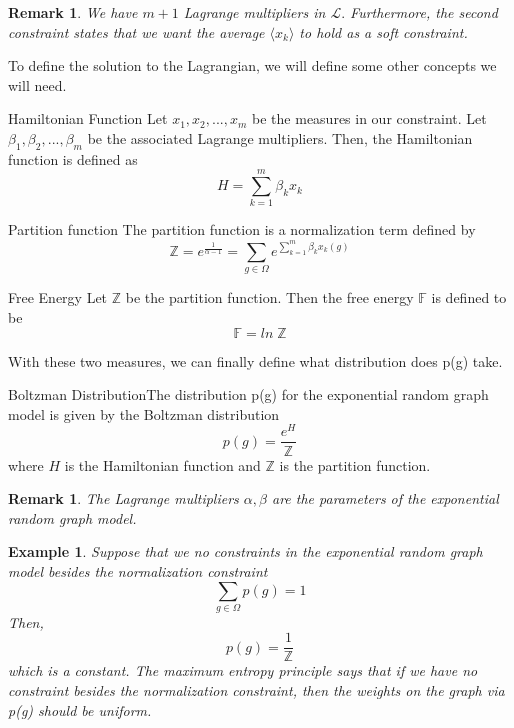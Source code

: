 \documentclass[twoside]{article}
\newtheorem{remark}[theorem]{Remark}
\newtheorem{example}[theorem]{Example}
\begin{document}
\begin{remark} We have $m + 1$ Lagrange multipliers in $\mathcal{L}.$ Furthermore, the second constraint states that we want the average $\langle x_k \rangle$ to hold as a soft constraint.
\end{remark}

To define the solution to the Lagrangian, we will define some other concepts we will need.

\begin{definition_exam}{Hamiltonian Function}{} Let $x_1, x_2, ..., x_m$ be the measures in our constraint. Let $\beta_1, \beta_2, ..., \beta_m$ be the associated Lagrange multipliers. Then, the Hamiltonian function is defined as 
$$
H = \sum_{k=1}^{m}\beta_kx_k
$$
\end{definition_exam}

\begin{definition_exam}{Partition function}{} The partition function is a normalization term defined by 
$$
\mathbb{Z} = e^{\frac{1}{\alpha - 1}} = \sum_{g \in \Omega}e^{\sum_{k=1}^{m}\beta_k x_k(g)}
$$
\end{definition_exam}

\begin{definition_exam}{Free Energy}{} Let $\mathbb{Z}$ be the partition function. Then the free energy $\mathbb{F}$ is defined to be 
$$
\mathbb{F} = ln\;\mathbb{Z}
$$
\end{definition_exam}

With these two measures, we can finally define what distribution does p(g) take.
\begin{definition_exam}{Boltzman Distribution}{}The distribution p(g) for the exponential random graph model is given by the Boltzman distribution 
$$
p(g) = \frac{e^{H}}{\mathbb{Z}}
$$
where $H$ is the Hamiltonian function and $\mathbb{Z}$ is the partition function.
\end{definition_exam}

\begin{remark} The Lagrange multipliers $\alpha, \beta$ are the parameters of the exponential random graph model. 
\end{remark}

\begin{example} Suppose that we no constraints in the exponential random graph model besides the normalization constraint 
$$
\sum_{g \in \Omega}p(g) = 1
$$
Then, 
$$
p(g) = \frac{1}{\mathbb{Z}}
$$
which is a constant. The maximum entropy principle says that if we have no constraint besides the normalization constraint, then the weights on the graph via p(g) should be uniform.
\end{example}
\end{document}
